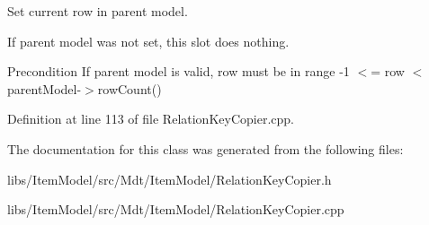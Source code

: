 Set current row in parent model. 

If parent model was not set, this slot does nothing.

\begin{DoxyPrecond}{Precondition}
If parent model is valid, row must be in range -\/1 $<$= row $<$ parent\+Model-\/$>$row\+Count() 
\end{DoxyPrecond}


Definition at line 113 of file Relation\+Key\+Copier.\+cpp.



The documentation for this class was generated from the following files\+:\begin{DoxyCompactItemize}
\item 
libs/\+Item\+Model/src/\+Mdt/\+Item\+Model/Relation\+Key\+Copier.\+h\item 
libs/\+Item\+Model/src/\+Mdt/\+Item\+Model/Relation\+Key\+Copier.\+cpp\end{DoxyCompactItemize}
